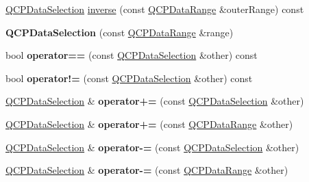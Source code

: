 \begin{DoxyCompactItemize}
\item 
\hyperlink{class_q_c_p_data_selection}{Q\+C\+P\+Data\+Selection} \hyperlink{class_q_c_p_data_selection_ae8097f4e4ffee7b1b5df27c93eb365db}{inverse} (const \hyperlink{class_q_c_p_data_range}{Q\+C\+P\+Data\+Range} \&outer\+Range) const
\item 
\mbox{\label{class_q_c_p_data_selection_a738dfb4f5718c5df5ed35ea33ac37818}} 
{\bfseries Q\+C\+P\+Data\+Selection} (const \hyperlink{class_q_c_p_data_range}{Q\+C\+P\+Data\+Range} \&range)
\item 
\mbox{\label{class_q_c_p_data_selection_a664fa566569b17148abafd6b1dbbf347}} 
bool {\bfseries operator==} (const \hyperlink{class_q_c_p_data_selection}{Q\+C\+P\+Data\+Selection} \&other) const
\item 
\mbox{\label{class_q_c_p_data_selection_a8324733cc88660ee4792ee60d6a4520c}} 
bool {\bfseries operator!=} (const \hyperlink{class_q_c_p_data_selection}{Q\+C\+P\+Data\+Selection} \&other) const
\item 
\mbox{\label{class_q_c_p_data_selection_a4489657a10fc18b3e5b123f2a1d049cc}} 
\hyperlink{class_q_c_p_data_selection}{Q\+C\+P\+Data\+Selection} \& {\bfseries operator+=} (const \hyperlink{class_q_c_p_data_selection}{Q\+C\+P\+Data\+Selection} \&other)
\item 
\mbox{\label{class_q_c_p_data_selection_a041a5aee161401628779b206891322ff}} 
\hyperlink{class_q_c_p_data_selection}{Q\+C\+P\+Data\+Selection} \& {\bfseries operator+=} (const \hyperlink{class_q_c_p_data_range}{Q\+C\+P\+Data\+Range} \&other)
\item 
\mbox{\label{class_q_c_p_data_selection_afbfd6dc65d809ad0e8517f25ee616baa}} 
\hyperlink{class_q_c_p_data_selection}{Q\+C\+P\+Data\+Selection} \& {\bfseries operator-\/=} (const \hyperlink{class_q_c_p_data_selection}{Q\+C\+P\+Data\+Selection} \&other)
\item 
\mbox{\label{class_q_c_p_data_selection_a2c57c281b54040a0a342b41f2f5b2e94}} 
\hyperlink{class_q_c_p_data_selection}{Q\+C\+P\+Data\+Selection} \& {\bfseries operator-\/=} (const \hyperlink{class_q_c_p_data_range}{Q\+C\+P\+Data\+Range} \&other)

\end{DoxyCompactItemize}
